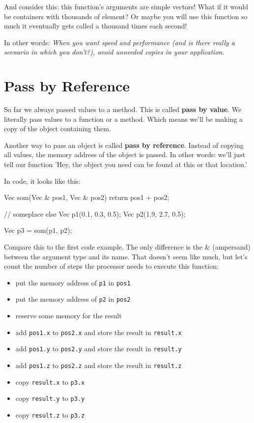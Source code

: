 And consider this: this function's arguments are simple vectors! What if it would be containers with thousands of element? Or maybe you will use this function so much it eventually gets called a thousand times each second!

In other words: \emph{When you want speed and performance (and is there really a scenario in which you don't?), avoid unneeded copies in your application.}

\section{Pass by Reference}
So far we always passed values to a method. This is called \textbf{pass by value}. We literally pass values to a function or a method. Which means we'll be making a copy of the object containing them.

Another way to pass an object is called \textbf{pass by reference}. Instead of copying all values, the memory address of the object is passed. In other words: we'll just tell our function 'Hey, the object you need can be found at this or that location.'

In code, it looks like this:
\begin{code}
Vec som(Vec & pos1, Vec & pos2) {
  return pos1 + pos2;
}

// someplace else
Vec p1(0.1, 0.3, 0.5);
Vec p2(1.9, 2.7, 0.5);

Vec p3 = som(p1, p2); 
\end{code}

Compare this to the first code example. The only difference is the \& (ampersand) between the argument type and its name. That doesn't seem like much, but let's count the number of steps the processor needs to execute this function:

\begin{itemize}
\item put the memory address of \texttt{p1} in \texttt{pos1}
\item put the memory address of \texttt{p2} in \texttt{pos2}
\item reserve some memory for the result
\item add \texttt{pos1.x} to \texttt{pos2.x} and store the result in \texttt{result.x}
\item add \texttt{pos1.y} to \texttt{pos2.y} and store the result in \texttt{result.y}
\item add \texttt{pos1.z} to \texttt{pos2.z} and store the result in \texttt{result.z}
\item copy \texttt{result.x} to \texttt{p3.x}
\item copy \texttt{result.y} to \texttt{p3.y}
\item copy \texttt{result.z} to \texttt{p3.z}
\end{itemize}

